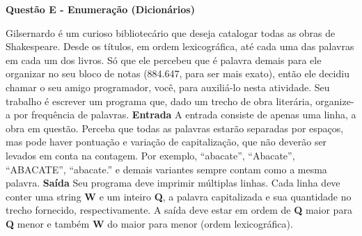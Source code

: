 \documentclass[a4paper, 12pt]{article}
\begin{document}
\newpage %
\begin{center}
\textbf{{\Large Questão E - Enumeração (Dicionários)}}
\end{center}
\vspace{5pt}
Gilsernardo é um curioso bibliotecário que deseja catalogar todas as obras de
Shakespeare. Desde os títulos, em ordem lexicográfica, até cada uma das
palavras em cada um dos livros. Só que ele percebeu que é palavra demais para
ele organizar no seu bloco de notas (884.647, para ser mais exato), então ele
decidiu chamar o seu amigo programador, você, para auxiliá-lo nesta atividade. \newline \newline
Seu trabalho é escrever um programa que, dado um trecho de obra literária,
organize-a por frequência de palavras.
\newline \newline
\textbf{{\large Entrada}} \newline
A entrada consiste de apenas uma linha, a obra em questão. Perceba que todas as
palavras estarão separadas por espaços, mas pode haver pontuação e variação de
capitalização, que não deverão ser levados em conta na contagem. Por exemplo,
``abacate'', ``Abacate'', ``ABACATE'', ``abacate.'' e demais variantes sempre contam
como a mesma palavra.
\newline \newline
\textbf{{\large Saída}} \newline
Seu programa deve imprimir múltiplas linhas. Cada linha deve conter uma string \textbf{W}
e um inteiro \textbf{Q}, a palavra capitalizada e sua quantidade no trecho fornecido,
respectivamente. A saída deve estar em ordem de \textbf{Q} maior para \textbf{Q} menor e também \textbf{W} do maior para menor (ordem lexicográfica).
\end{document}
